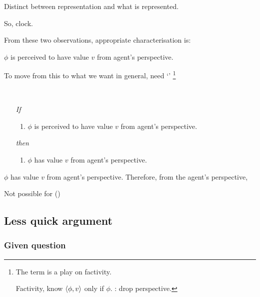 \begin{note}
  Distinct between representation and what is represented.

  So, clock.

  
\end{note}

\begin{note}
  From these two observations, appropriate characterisation is:

  \(\phi\) is perceived to have value \(v\) from agent's perspective.

  To move from this to what we want in general, need `\emph{}'%
  \footnote{
    The term is a play on factivity.

    Factivity, know \(\langle \phi, v \rangle\) only if \(\phi\).
    : drop perspective.
  }

  \begin{idea}[\ptivity{2}]
    \label{def:perspectivity}
    \mbox{ }
    \begin{enumerate}
    \item[\emph{If}]
      \begin{enumerate}[label=\alph*., ref=(\alph*)]
      \item
        \(\phi\) is perceived to have value \(v\) from agent's perspective.
      \end{enumerate}
    \item[\emph{then}]
      \begin{enumerate}[label=\alph*., ref=(\alph*), resume]
      \item
        \(\phi\) has value \(v\) from agent's perspective.
      \end{enumerate}
    \end{enumerate}
  \end{idea}
\end{note}

\begin{note}
  \(\phi\) has value \(v\) from agent's perspective.
  Therefore, from the agent's perspective,

  Not possible for ()
\end{note}

\subsection{Less quick argument}
\label{sec:less-quick-argument}

\subsubsection{Given question}
\label{sec:given-question}

